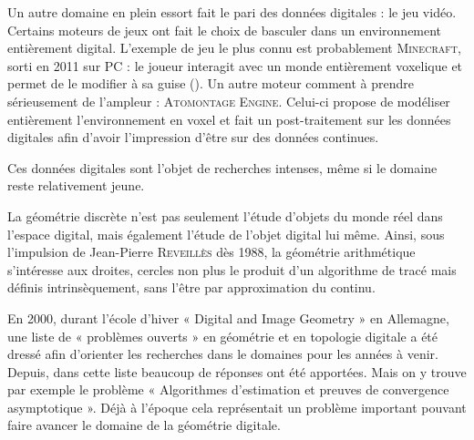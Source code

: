 Un autre domaine en plein essort fait le pari des données digitales : le jeu
vidéo. Certains moteurs de jeux ont fait le choix de basculer dans un
environnement entièrement digital. L'exemple de jeu le plus connu est
probablement \textsc{Minecraft}, sorti en 2011 sur PC : le joueur interagit avec
un monde entièrement voxelique et permet de le modifier à sa guise (). Un autre
moteur comment à prendre sérieusement de l'ampleur : \textsc{Atomontage Engine}.
Celui-ci propose de modéliser entièrement l'environnement en voxel et fait un
post-traitement sur les données digitales afin d'avoir l'impression d'être sur
des données continues.

Ces données digitales sont l'objet de recherches intenses, même si le domaine
reste relativement jeune.

La géométrie discrète n'est pas seulement l'étude d'objets du monde réel dans
l'espace digital, mais également l'étude de l'objet digital lui même. Ainsi,
sous l'impulsion de Jean-Pierre \textsc{Reveillès} dès 1988, la géométrie
arithmétique s'intéresse aux droites, cercles non plus le produit d’un
algorithme de tracé mais définis intrinsèquement, sans l’être par approximation
du continu.

En 2000, durant l'école d'hiver « Digital and Image Geometry » en Allemagne, une
liste de « problèmes ouverts » en géométrie et en topologie digitale a été
dressé \cite{Klette2000OpenProblems} afin d'orienter les recherches dans le
domaines pour les années à venir. Depuis, dans cette liste beaucoup de réponses
ont été apportées. Mais on y trouve par exemple le problème « Algorithmes
d'estimation et preuves de convergence asymptotique ». Déjà à l'époque cela
représentait un problème important pouvant faire avancer le domaine de la
géométrie digitale.
